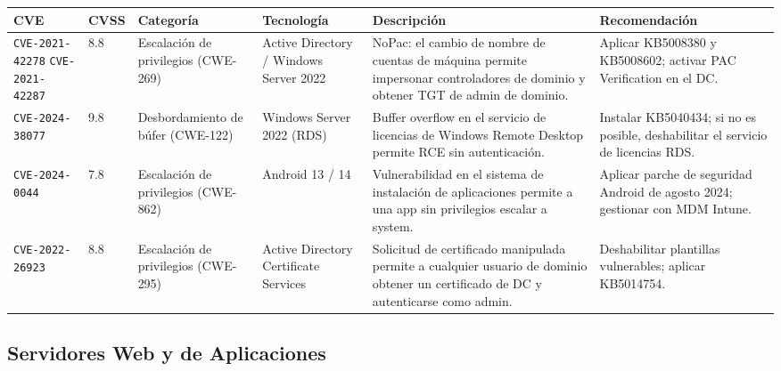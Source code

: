 \documentclass[letterpaper,11pt]{article}
\begin{document}
\begingroup\footnotesize
{}
\begin{tabular}{|p{2.3cm}|p{0.65cm}|p{1.9cm}|p{2.0cm}|p{3.9cm}|p{3.0cm}|}
\hline
\rowcolor{blue!22}
\textbf{CVE} & \textbf{CVSS} & \textbf{Categoría} & \textbf{Tecnología} & \textbf{Descripción} & \textbf{Recomendación} \\
\hline
\texttt{CVE-2021-42278} \newline \texttt{CVE-2021-42287} & 8.8 & Escalación de privilegios (CWE-269) & Active Directory / Windows Server 2022 & NoPac: el cambio de nombre de cuentas de máquina permite impersonar controladores de dominio y obtener TGT de admin de dominio. & Aplicar KB5008380 y KB5008602; activar PAC Verification en el DC. \\
\hline
\texttt{CVE-2024-38077} & 9.8 & Desbordamiento de búfer (CWE-122) & Windows Server 2022 (RDS) & Buffer overflow en el servicio de licencias de Windows Remote Desktop permite RCE sin autenticación. & Instalar KB5040434; si no es posible, deshabilitar el servicio de licencias RDS. \\
\hline
\texttt{CVE-2024-0044} & 7.8 & Escalación de privilegios (CWE-862) & Android 13 / 14 & Vulnerabilidad en el sistema de instalación de aplicaciones permite a una app sin privilegios escalar a system. & Aplicar parche de seguridad Android de agosto 2024; gestionar con MDM Intune. \\
\hline
\texttt{CVE-2022-26923} & 8.8 & Escalación de privilegios (CWE-295) & Active Directory Certificate Services & Solicitud de certificado manipulada permite a cualquier usuario de dominio obtener un certificado de DC y autenticarse como admin. & Deshabilitar plantillas vulnerables; aplicar KB5014754. \\
\hline
\end{tabular}
\endgroup

\subsection{Servidores Web y de Aplicaciones}
\end{document}
